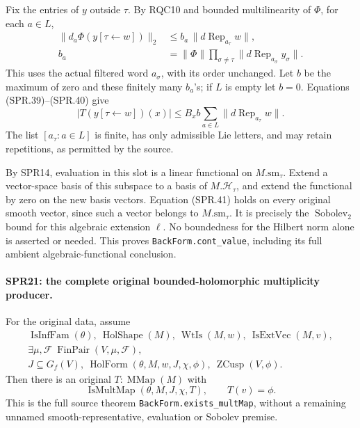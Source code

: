 Fix the entries of \(y\) outside \(\tau\).
By RQC10 and bounded multilinearity of \(\Phi\), for each \(a\in L\),
\[
\begin{split}
 \|d_a\Phi(y[\tau\leftarrow w])\|_2
 &\le b_a\,\|d\operatorname{Rep}_{a_\tau}w\|,\\
 b_a&=\|\Phi\|\prod_{\sigma\ne\tau}
                    \|d\operatorname{Rep}_{a_\sigma}y_\sigma\|.
\end{split}
\tag{SPR.40}
\]
This uses the actual filtered word \(a_\sigma\), with its order
unchanged.
Let \(b\) be the maximum of zero and these finitely many \(b_a\)'s;
if \(L\) is empty let \(b=0\).
Equations (SPR.39)--(SPR.40) give
\[
 |T(y[\tau\leftarrow w])(x)|
 \le B_xb\sum_{a\in L}
                         \|d\operatorname{Rep}_{a_\tau}w\|.
 \tag{SPR.41}
\]
The list \([a_\tau:a\in L]\) is finite, has only admissible Lie
letters, and may retain repetitions, as permitted by the source.

By SPR14, evaluation in this slot is a linear functional on
\(M.\mathrm{sm}_\tau\).
Extend a vector-space basis of this subspace to a basis of
\(M.\mathcal H_\tau\), and extend the functional by zero on the
new basis vectors.
Equation (SPR.41) holds on every original smooth vector, since
such a vector belongs to \(M.\mathrm{sm}_\tau\).
It is precisely the \(\operatorname{Sobolev}_2\) bound for this
algebraic extension \(\ell\).
No boundedness for the Hilbert norm alone is asserted or needed.
This proves \texttt{BackForm.\allowbreak cont\_\allowbreak value}, including its full
ambient algebraic-functional conclusion.

\paragraph{SPR21: the complete original bounded-holomorphic multiplicity producer.}
\label{claim:SPR21}
For the original data, assume
\[
\begin{gathered}
 \operatorname{IsInfFam}(\theta),\
 \operatorname{HolShape}(M),\
 \operatorname{WtIs}(M,w),\
 \operatorname{IsExtVec}(M,v),\\
 \exists\mu,\mathcal F\ \operatorname{FinPair}(V,\mu,\mathcal F),\\
 J\subseteq G_f(V),\
 \operatorname{HolForm}(\theta,M,w,J,\chi,\phi),\
 \operatorname{ZCusp}(V,\phi).
\end{gathered}
\tag{SPR.42}
\]
Then there is an original \(T:\operatorname{MMap}(M)\) with
\[
                   \operatorname{IsMultMap}(\theta,M,J,\chi,T),
                                  \qquad T(v)=\phi.
 \tag{SPR.43}
\]
This is the full source theorem
\texttt{BackForm.\allowbreak exists\_\allowbreak multMap}, without a remaining unnamed
smooth-representative, evaluation or Sobolev premise.

